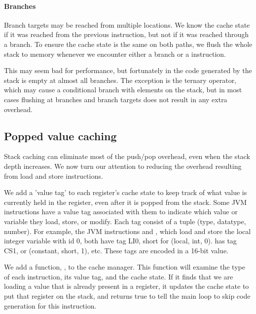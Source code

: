 \paragraph{Branches} Branch targets may be reached from multiple locations. We know the cache state if it was reached from the previous instruction, but not if it was reached through a branch. To ensure the cache state is the same on both paths, we flush the whole stack to memory whenever we encounter either a branch or a  instruction. 

This may seem bad for performance, but fortunately in the code generated by  the stack is empty at almost all branches. The exception is the ternary  \mycode{:} operator, which may cause a conditional branch with elements on the stack, but in most cases flushing at branches and branch targets does not result in any extra overhead.

\subsection{Popped value caching}
\label{sec-optimisations-popped-value-caching}
Stack caching can eliminate most of the push/pop overhead, even when the stack depth increases. We now turn our attention to reducing the overhead resulting from load and store instructions.



We add a 'value tag' to each register's cache state to keep track of what value is currently held in the register, even after it is popped from the stack. Some JVM instructions have a value tag associated with them to indicate which value or variable they load, store, or modify. Each tag consist of a tuple (type, datatype, number). For example, the JVM instructions  and , which load and store the local integer variable with id 0, both have tag LI0, short for (local, int, 0).  has tag CS1, or (constant, short, 1), etc. These tags are encoded in a 16-bit value.

We add a function, , to the cache manager. This function will examine the type of each instruction, its value tag, and the cache state. If it finds that we are loading a value that is already present in a register, it updates the cache state to put that register on the stack, and returns true to tell the main loop to skip code generation for this instruction.

